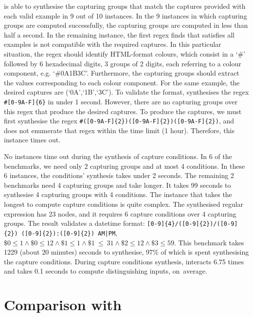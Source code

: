 \Forest is able to synthesise the capturing groups that match the captures provided with each valid example in 9 out of 10 instances. In the 9 instances in which capturing groups are computed successfully, the capturing groups are computed in less than half a second.
In the remaining instance, the first regex \Forest finds that satisfies all examples is not compatible with the required captures.
In this particular situation, the regex should identify HTML-format colours, which consist in a `\#' followed by 6 hexadecimal digits, 3 groups of 2 digits, each referring to a colour component, e.g. `\#0A1B3C'.
Furthermore, the capturing groups should extract the values corresponding to each colour component. For the same example, the desired captures are (`0A',`1B',`3C'). To validate the format, \Forest synthesises the regex \verb`#[0-9A-F]{6}` in under 1 second.
However, there are no capturing groups over this regex that produce the desired captures. To produce the captures, we must first synthesise the regex
\verb`#([0-9A-F]{2})([0-9A-F]{2})([0-9A-F]{2})`, and \Forest does not enumerate that regex within the time limit (1 hour). Therefore, this instance times out.

No instances time out during the synthesis of capture conditions.
In 6 of the benchmarks, we need only 2 capturing groups and at most 4 conditions.
In these 6 instances, the conditions' synthesis takes under 2 seconds.
The remaining 2 benchmarks need 4 capturing groups and take longer.
It takes 99 seconds to synthesise 4 capturing groups with 4 conditions.
The instance that takes the longest to compute capture conditions is quite complex. The synthesised regular expression has 23 nodes, and it requires 6 capture conditions over 4 capturing groups. The result validates a datetime format: \verb`[0-9]{4}/([0-9]{2})/([0-9]{2}) ([0-9]{2}):([0-9]{2}) AM|PM`, \(\$0\le1 \land \$0\le12 \land \$1\le1 \land \$1~\le~31 \land \$2\le12 \land \$3\le59\). This benchmark takes 1229 (about 20 minutes) seconds to synthesise, 97\% of which is spent synthesising the capture conditions.
%
During capture conditions synthesis, \Forest interacts 6.75 times and takes 0.1 seconds to compute distinguishing inputs, on~average.


\section{Comparison with \Regel}\label{sec:comp-regel}

